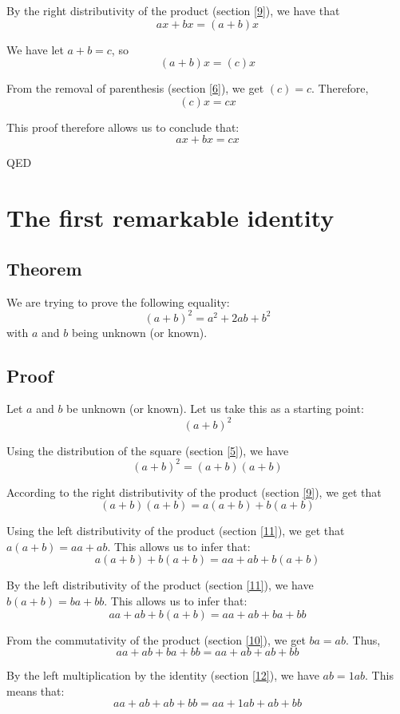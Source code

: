 \documentclass[a4paper]{article}
\begin{document}
By the right distributivity of the product (section \ref{9}), we have that
\[ax+bx=\left(a+b\right)x\]

We have let $a+b=c$, so
\[\left(a+b\right)x=\left(c\right)x\]

From the removal of parenthesis (section \ref{6}), we get $\left(c\right)=c$. Therefore,
\[\left(c\right)x=cx\]

This proof therefore allows us to conclude that:
\[ax+bx = cx\]
\begin{flushright}
QED
\end{flushright}



\section{The first remarkable identity\label{4}}
\subsection{Theorem}
We are trying to prove the following equality:
\[\left(a+b\right)^2 = a^2 + 2ab + b^2\]
with $a$ and $b$ being unknown (or known).\subsection{Proof}
Let $a$ and $b$ be unknown (or known). Let us take this as a starting point:
\[\left(a+b\right)^2\]

Using the distribution of the square (section \ref{5}), we have
\[\left(a+b\right)^2=\left(a+b\right)\left(a+b\right)\]

According to the right distributivity of the product (section \ref{9}), we get that
\[\left(a+b\right)\left(a+b\right)=a\left(a+b\right)+b\left(a+b\right)\]

Using the left distributivity of the product (section \ref{11}), we get that $a\left(a+b\right)=aa+ab$. This allows us to infer that:
\[a\left(a+b\right)+b\left(a+b\right)=aa+ab+b\left(a+b\right)\]

By the left distributivity of the product (section \ref{11}), we have $b\left(a+b\right)=ba+bb$. This allows us to infer that:
\[aa+ab+b\left(a+b\right)=aa+ab+ba+bb\]

From the commutativity of the product (section \ref{10}), we get $ba=ab$. Thus,
\[aa+ab+ba+bb=aa+ab+ab+bb\]

By the left multiplication by the identity (section \ref{12}), we have $ab=1ab$. This means that:
\[aa+ab+ab+bb=aa+1ab+ab+bb\]
\end{document}
